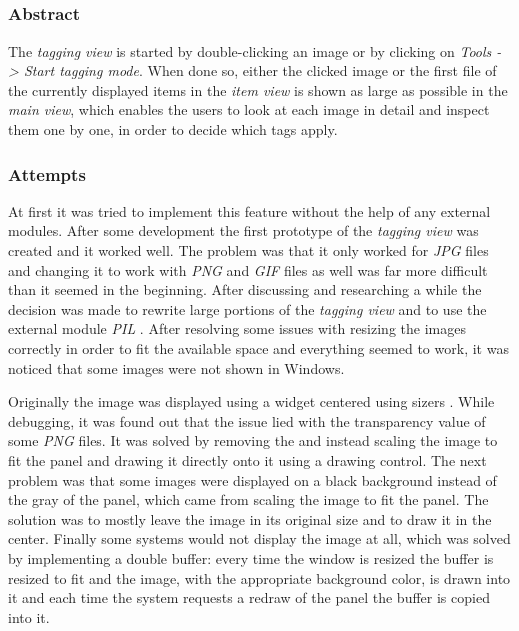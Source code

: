 \subsection{}
\def\kapitelautor{Christoph Führer, Clemens Stadlbauer, Erik Ritschl}
\label{subsec:mod:taggingview}

\subsubsection{Abstract}

The  \emph{tagging view} is started by double-clicking an image or by clicking on \emph{Tools -> Start tagging mode}. When done so, either the clicked image or the first file of the currently displayed items in the \emph{item view} is shown as large as possible in the \emph{main view}, which enables the users to look at each image in detail and inspect them one by one, in order to decide which tags apply.

\subsubsection{Attempts}

At first it was tried to implement this feature without the help of any external modules. After some development the first prototype of the \emph{tagging view} was created and it worked well. The problem was that it only worked for \emph{JPG} files and changing it to work with \emph{PNG} and \emph{GIF} files as well was far more difficult than it seemed in the beginning. After discussing and researching a while the decision was made to rewrite large portions of the \emph{tagging view} and to use the external module \emph{PIL} \cite{pil}. After resolving some issues with resizing the images correctly in order to fit the available space and everything seemed to work, it was noticed that some images were not shown in Windows.

Originally the image was displayed using a  \cite{wxStaticBitmap} widget centered
using sizers \cite{wxSizer}. While debugging, it was found out that the issue lied with the transparency value of some \emph{PNG} files. It was solved by removing the  and instead scaling the
image to fit the panel and drawing it directly onto it using a drawing control. The
next problem was that some images were displayed on a black background instead
of the gray of the panel, which came from scaling the image to fit the panel.
The solution was to mostly leave the image in its original size and to draw it in the center. Finally
some systems would not display the image at all, which was solved by
implementing a double buffer: every time the window is resized the buffer is
resized to fit and the image, with the appropriate background color, is drawn
into it and each time the system requests a redraw of the panel the buffer is
copied into it.

